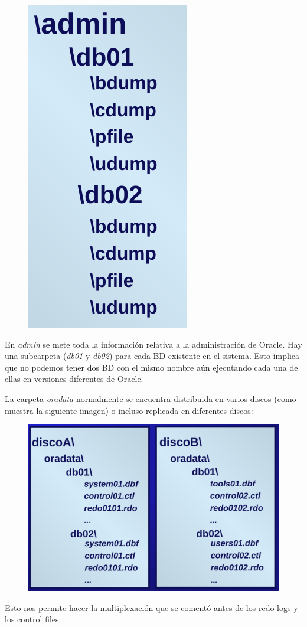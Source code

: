 \begin{figure}[H]
  \center
  \includegraphics[scale=0.25]{img/p20.png}
\end{figure}

En \textit{admin} se mete toda la información relativa a la administración de Oracle. Hay una subcarpeta (\textit{db01} y \textit{db02}) para cada BD existente en el sistema. Esto implica que no podemos tener dos BD con el mismo nombre aún ejecutando cada una de ellas en versiones diferentes de Oracle.

La carpeta \textit{oradata} normalmente se encuentra distribuida en varios discos (como muestra la siguiente imagen) o incluso replicada en diferentes discos:
\begin{figure}[H]
  \center
  \includegraphics[scale=0.25]{img/p21.png}
\end{figure}
Esto nos permite hacer la multiplexación que se comentó antes de los redo logs y los control files.

